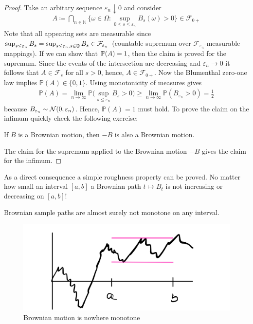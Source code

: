 \begin{proof}[Proof]
	Take an arbitary sequence $\varepsilon_n \downarrow 0$ and consider 
	\begin{align*}
		A \coloneqq \bigcap_{n\in\mathbb{N}} \Big\{ \omega\in\Omega \colon \sup_{0\leq s \leq \varepsilon_n} B_s(\omega) > 0\Big\}\in \mathcal F_{0+}
	\end{align*}
	Note that all appearing sets are measurable since $\sup_{s \leq \varepsilon_n}B_s=\sup_{s \leq \varepsilon_n, s\in \Q}B_s \in \mathcal F_{\varepsilon_n}$ (countable supremum over $\mathcal F_{\varepsilon_n}$-measurable mappings). If we can show that $\P(A)=1$, then the claim is proved for the supremum.	Since the events of the intersection are decreasing and $\varepsilon_n\to 0$ it follows that $A\in \mathcal F_s$ for all $s>0$, hence, $A\in \mathcal F_{0+}$. Now the Blumenthal zero-one law implies $\mathbb{P}(A)\in \{0,1\}$. Using monotonicity of measures gives
	\begin{align*}
		\mathbb{P}(A) = \lim_{n\to\infty} \mathbb{P}\big(\sup_{s\leq \varepsilon_n}B_s > 0\big) \geq \lim_{n\to\infty} \mathbb{P}(B_{\varepsilon_n}>0) = \frac{1}{2}
	\end{align*}
	because $B_{\varepsilon_n}\sim \cN(0,\varepsilon_n)$. Hence, $\mathbb{P}(A)=1$ must hold. To prove the claim on the infimum quickly check the following exercise: 
	\begin{luebung}
		If $B$ is a Brownian motion, then $-B$ is also a Brownian motion.
	\end{luebung}	
	The claim for the supremum applied to the Brownian motion $-B$ gives the claim for the infimum. 
\end{proof}
As a direct consequence a simple roughness property can be proved. No matter how small an interval $[a,b]$ a Brownian path $t\mapsto B_t$ is not increasing or decreasing on $[a,b]$!
\begin{lSatzHerz}
\begin{theorem}
	Brownian sample paths are almost surely not monotone on any interval.
\end{theorem}
\end{lSatzHerz}
\begin{figure}[h]
	\begin{center}
		\includegraphics[scale=0.1]{monotonepaths.jpeg}
		\caption*{Brownian motion is nowhere monotone}
	\end{center}
	\end{figure}
